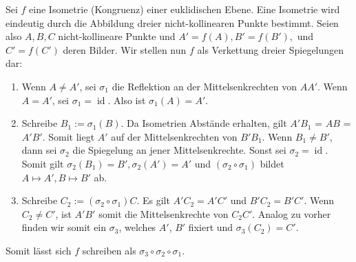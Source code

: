 \begin{minipage}{0.5\linewidth}
    Sei $f$ eine Isometrie (Kongruenz) einer euklidischen Ebene. Eine Isometrie wird eindeutig durch die Abbildung dreier nicht-kollinearen Punkte bestimmt.
    Seien also $A, B, C$ nicht-kollineare Punkte und $A' = f(A), B' = f(B'),$ und $C' = f(C')$ deren Bilder. Wir stellen nun $f$ als Verkettung dreier Spiegelungen dar:
    \begin{enumerate}
        \item Wenn $A \neq A'$, sei $\sigma_1$ die Reflektion an der Mittelsenkrechten von $AA'$. Wenn $A = A'$, sei $\sigma_1 = \operatorname{id}$. Also ist $\sigma_1(A) = A'$.
        \item Schreibe $B_1 := \sigma_1(B)$. Da Isometrien Abstände erhalten, gilt $A'B_1$ = $AB$ = $A'B'$. Somit liegt $A'$ auf der Mittelsenkrechten von $B'B_1$. Wenn $B_1 \neq B'$, dann sei $\sigma_2$ die Spiegelung an jener Mittelsenkrechte. Sonst sei $\sigma_2 = \operatorname{id}$. Somit gilt $\sigma_2(B_1) = B', \sigma_2(A') = A'$ und $(\sigma_2 \circ \sigma_1)$ bildet $A \mapsto A', B \mapsto B'$ ab. 
        \item Schreibe $C_2 := (\sigma_2 \circ \sigma_1)C$. Es gilt $A'C_2 = A'C'$ und $B'C_2 = B'C'$. Wenn $C_2 \neq C'$, ist $A'B'$ somit die Mittelsenkrechte von $C_2C'$. Analog zu vorher finden wir somit ein $\sigma_3$, welches $A'$, $B'$ fixiert und $\sigma_3(C_2) = C'$.
    \end{enumerate}
    Somit lässt sich $f$ schreiben als $\sigma_3 \circ \sigma_2 \circ \sigma_1$.
\end{minipage}
\begin{minipage}{0.49\linewidth}
    \begin{center}
    \end{center}
\end{minipage}

